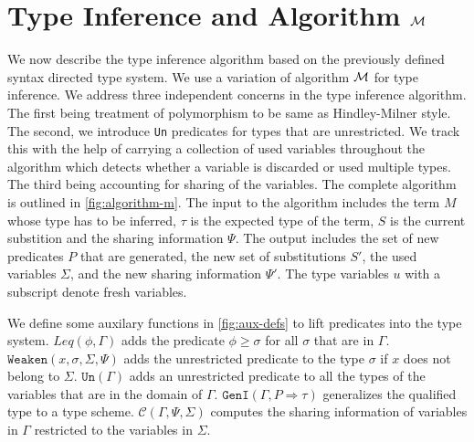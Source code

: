 \section{Type Inference and Algorithm $\mathcal{M}$}\label{sec:algorithm-m}
We now describe the type inference algorithm based on the previously defined syntax directed
type system. We use a variation of algorithm $\mathcal{M}$ \citep{lee_proofs_1998} for type inference.
We address three independent concerns in the type inference algorithm.
The first being treatment of polymorphism to be same as Hindley-Milner style. The second, we introduce
\texttt{Un} predicates for types that are unrestricted. We track this with the help of carrying a
collection of used variables throughout the algorithm which detects whether a variable is discarded
or used multiple types. The third being accounting for sharing of the variables.
The complete algorithm is outlined in \cref{fig:algorithm-m}. The input to the algorithm includes the term $M$ whose
type has to be inferred, $\tau$ is the expected type of the term, $S$ is the current substition and the
sharing information $\Psi$. The output includes the set of new predicates $P$ that are generated,
the new set of substitutions $S'$, the used variables $\Sigma$, and the new sharing information $\Psi'$.
The type variables $u$ with a subscript denote fresh variables.

We define some auxilary functions in \cref{fig:aux-defs} to lift predicates into the type system.
$Leq(\phi, \Gamma)$ adds the predicate $\phi \geq \sigma$ for all $\sigma$ that are in $\Gamma$.
$\texttt{Weaken}(x, \sigma, \Sigma, \Psi)$ adds the unrestricted predicate to the type $\sigma$
if $x$ does not belong to $\Sigma$. $\texttt{Un}(\Gamma)$ adds an unrestricted
predicate to all the types of the variables that are in the domain of $\Gamma$.
$\texttt{GenI}(\Gamma, P \Rightarrow \tau)$ generalizes the qualified type to a type scheme.
$\mathcal{C}(\Gamma, \Psi, \Sigma)$ computes the sharing information of variables in $\Gamma$
restricted to the variables in $\Sigma$.

